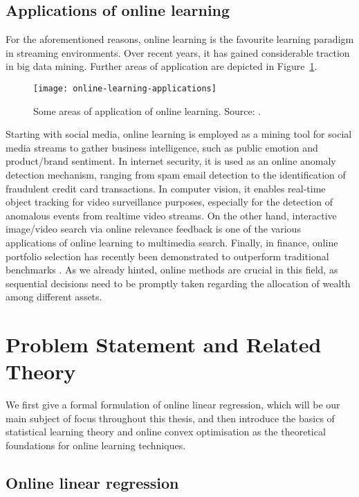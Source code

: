 \subsection{Applications of online learning}

For the aforementioned reasons, online learning is the favourite learning paradigm in streaming environments. Over recent years, it has gained considerable traction in big data mining. Further areas of application are depicted in Figure~\ref{fig:online-learning-applications}.
\begin{figure}[H]
	\texttt{[image: online-learning-applications]}
	\caption{Some areas of application of online learning. Source: \citep{hoi-ol-tutorial}.}
	\label{fig:online-learning-applications}
\end{figure}

Starting with social media, online learning is employed as a mining tool for social media streams to gather business intelligence, such as public emotion and product/brand sentiment. In internet security, it is used as an online anomaly detection mechanism, ranging from spam email detection to the identification of fraudulent credit card transactions. In computer vision, it enables real-time object tracking for video surveillance purposes, especially for the detection of anomalous events from realtime video streams. On the other hand, interactive image/video search via online relevance feedback is one of the various applications of online learning to multimedia search. Finally, in finance, online portfolio selection has recently been demonstrated to outperform traditional benchmarks \citep{olps-survey}. As we already hinted, online methods are crucial in this field, as sequential decisions need to be promptly taken regarding the allocation of wealth among different assets.




\section{Problem Statement and Related Theory}

We first give a formal formulation of online linear regression, which will be our main subject of focus throughout this thesis, and then introduce the basics of statistical learning theory and online convex optimisation as the theoretical foundations for online learning techniques.


\subsection{Online linear regression}

